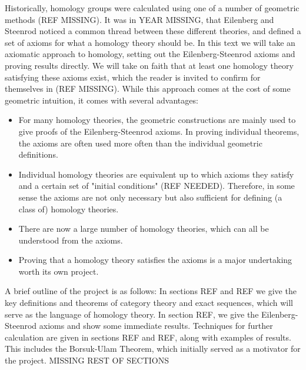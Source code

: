 Historically, homology groups were calculated using one of a number of geometric methods (REF MISSING). It was in YEAR MISSING, that Eilenberg and Steenrod noticed a common thread between these different theories, and defined a set of axioms for what a homology theory should be. In this text we will take an axiomatic approach to homology, setting out the Eilenberg-Steenrod axioms and proving results directly. We will take on faith that at least one homology theory satisfying these axioms exist, which the reader is invited to confirm for themselves in (REF MISSING). While this approach comes at the cost of some geometric intuition, it comes with several advantages:
\begin{itemize}
\item For many homology theories, the geometric constructions are mainly used to give proofs of the Eilenberg-Steenrod axioms. In proving individual theorems, the axioms are often used more often than the individual geometric definitions.
\item Individual homology theories are equivalent up to which axioms they satisfy and a certain set of "initial conditions" (REF NEEDED). Therefore, in some sense the axioms are not only necessary but also sufficient for defining (a class of) homology theories.
\item There are now a large number of homology theories, which can all be understood from the axioms.
\item Proving that a homology theory satisfies the axioms is a major undertaking worth its own project.
\end{itemize}

A brief outline of the project is as follows: In sections REF and REF we give the key definitions and theorems of category theory and exact sequences, which will serve as the language of homology theory. In section REF, we give the Eilenberg-Steenrod axioms and show some immediate results. Techniques for further calculation are given in sections REF and REF, along with examples of results. This includes the Borsuk-Ulam Theorem, which initially served as a motivator for the project. MISSING REST OF SECTIONS